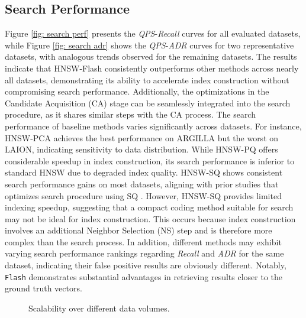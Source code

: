 \subsection{Search Performance}
\label{subsec: search perf}

{Figure \ref{fig: search perf} presents the \textit{QPS}-\textit{Recall} curves for all evaluated datasets, while Figure \ref{fig: search adr} shows the \textit{QPS}-\textit{ADR} curves for two representative datasets, with analogous trends observed for the remaining datasets.} The results indicate that HNSW-Flash consistently outperforms other methods across nearly all datasets, demonstrating its ability to accelerate index construction without compromising search performance. Additionally, the optimizations in the Candidate Acquisition (CA) stage can be seamlessly integrated into the search procedure, as it shares similar steps with the CA process.
The search performance of baseline methods varies significantly across datasets. For instance, HNSW-PCA achieves the best performance on ARGILLA but the worst on LAION, indicating sensitivity to data distribution. While HNSW-PQ offers considerable speedup in index construction, its search performance is inferior to standard HNSW due to degraded index quality. HNSW-SQ shows consistent search performance gains on most datasets, aligning with prior studies that optimizes search procedure using SQ \cite{LVQ}. However, HNSW-SQ provides limited indexing speedup, suggesting that a compact coding method suitable for search may not be ideal for index construction. This occurs because index construction involves an additional Neighbor Selection (NS) step and is therefore more complex than the search process. {In addition, different methods may exhibit varying search performance rankings regarding \textit{Recall} and \textit{ADR} for the same dataset, indicating their false positive results are obviously different. Notably, \texttt{Flash} demonstrates substantial advantages in retrieving results closer to the ground truth vectors.}

\begin{figure}
\vspace{-0.1cm}
  \setlength{\abovecaptionskip}{0cm}
  \setlength{\belowcaptionskip}{0cm}
  \centering
  \footnotesize
  \hspace{0.15cm}
  \newline
  \caption{Scalability over different data volumes.}
  \label{fig: scalability data volume}
  \vspace{-0.2cm}
\end{figure}

